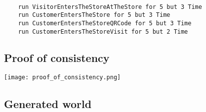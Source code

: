 \begin{lstlisting}[language=alloy]
    
    run VisitorEntersTheStoreAtTheStore for 5 but 3 Time
    run CustomerEntersTheStore for 5 but 3 Time
    run CustomerEntersTheStoreQRCode for 5 but 3 Time
    run CustomerEntersTheStoreVisit for 5 but 2 Time

\end{lstlisting}

\subsection{Proof of consistency}

    \begin{center}
        \texttt{[image: proof\_of\_consistency.png]}
    \end{center}

\subsection{Generated world}